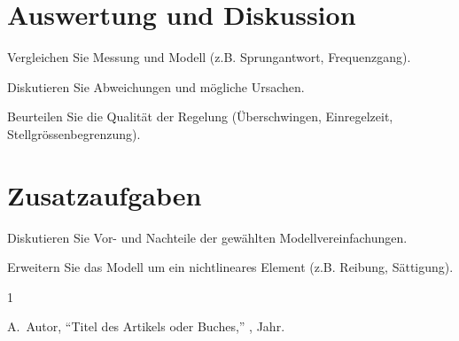 \documentclass[a4paper,11pt]{scrartcl}
\begin{document}
\begin{answerboxfillpage}
\end{answerboxfillpage}

\section{Auswertung und Diskussion}

\begin{aufgaben}
    \item Vergleichen Sie Messung und Modell (z.B. Sprungantwort, Frequenzgang).
    \item Diskutieren Sie Abweichungen und mögliche Ursachen.
    \item Beurteilen Sie die Qualität der Regelung (Überschwingen, Einregelzeit, Stellgrössenbegrenzung).
\end{aufgaben}

\begin{answerboxruled}[8]
\end{answerboxruled}

\section*{Zusatzaufgaben}

\begin{aufgaben}[Zusatzaufgaben]
    \item Diskutieren Sie Vor- und Nachteile der gewählten Modellvereinfachungen.
    \item Erweitern Sie das Modell um ein nichtlineares Element (z.B. Reibung, Sättigung).
\end{aufgaben}

\begin{answerboxruled}[5]
\end{answerboxruled}

\begin{thebibliography}{1}

    A.~Autor,
    \newblock ``Titel des Artikels oder Buches,''
    , Jahr.

\end{thebibliography}
\end{document}

